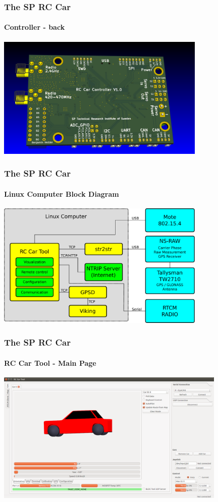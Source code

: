 \documentclass[aspectratio=169,electronics,notopline]{beamer}
\begin{document}
\begin{frame} 
\frametitle{The SP RC Car}
\framesubtitle{Controller - back}
\begin{center}
	\includegraphics[width=10cm]{Figures/controller_back.png}
\end{center}
\end{frame}

\begin{frame} 
\frametitle{The SP RC Car}
\framesubtitle{Linux Computer Block Diagram}
\begin{center}
	\includegraphics[width=10cm]{Figures/linux_diagram.pdf}
\end{center}
\end{frame}

\begin{frame} 
\frametitle{The SP RC Car}
\framesubtitle{RC Car Tool - Main Page}
\begin{center}
	\includegraphics[width=11cm]{Figures/GUI/car_orientation.png}
\end{center}
\end{frame}
\end{document}
